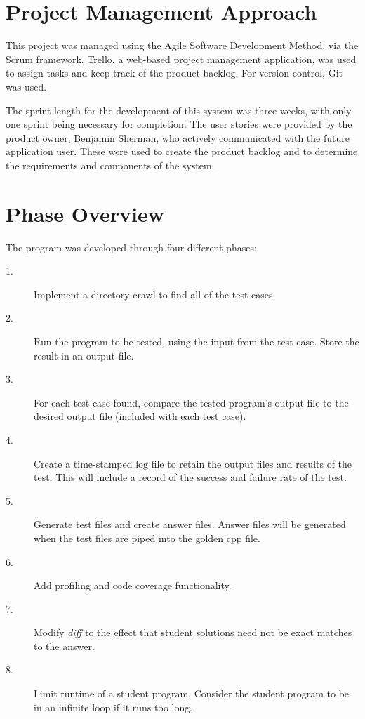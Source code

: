 \section{Project  Management Approach}
This project was managed using the Agile Software Development Method, via the Scrum framework.
Trello, a web-based project management application, was used to assign tasks and keep track of 
the product backlog.  For version control, Git was used.

The sprint length for the development of this system was three weeks, with
only one sprint being necessary for completion.  The user stories were provided by the product 
owner, Benjamin Sherman, who actively communicated with the future application user.  These were used
to create the product backlog and to determine the requirements and components of the system.


\section{Phase  Overview}
The program was developed through four different phases:
\begin{description}
\item[1. ] Implement a directory crawl to find all of the test cases.
\item[2. ] Run the program to be tested, using the input from the test case. Store the result in an output file.
\item[3. ] For each test case found, compare the tested program's output file to the desired output file (included with each test case).
\item[4. ] Create a time-stamped log file to retain the output files and results of the test.  This will include a record of the success and failure rate of the test.
\item[5. ] Generate test files and create answer files. Answer files will be generated when the test files are piped into the golden cpp file.
\item[6. ] Add profiling and code coverage functionality.
\item[7. ] Modify \textit{diff} to the effect that student solutions need not be exact matches to the answer.
\item[8. ] Limit runtime of a student program. Consider the student program to be in an infinite loop if it runs too long.
\end{description}



